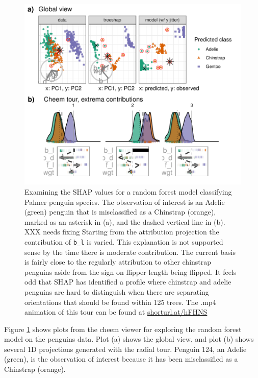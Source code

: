 \documentclass[
]{article}
\begin{document}
\begin{figure}

{\centering \includegraphics[width=1\linewidth]{./figures/case_penguins} 

}

\caption{Examining the SHAP values for a random forest model classifying Palmer penguin species. The observation of interest is an Adelie (green) penguin that is misclassified as a Chinstrap (orange), marked as an asterisk in (a), and the dashed vertical line in (b). XXX needs fixing Starting from the attribution projection the contribution of \texttt{b\_l} is varied. This explanation is not supported sense by the time there is moderate contribution. The current basis is fairly close to the regularly attribution to other chinstrap penguins aside from the sign on flipper length being flipped. It feels odd that SHAP has identified a profile where chinstrap and adelie penguins are hard to distinguish when there are separating orientations that should be found within 125 trees. The .mp4 animation of this tour can be found at \href{https://github.com/nspyrison/cheem_paper/blob/main/figures/case_penguins.mp4}{shorturl.at/hFHNS}}\label{fig:casepenguins}
\end{figure}

Figure \ref{fig:casepenguins} shows plots from the cheem viewer for exploring the random forest model on the penguins data. Plot (a) shows the global view, and plot (b) shows several 1D projections generated with the radial tour. Penguin 124, an Adelie (green), is the observation of interest because it has been misclassified as a Chinstrap (orange).
\end{document}
